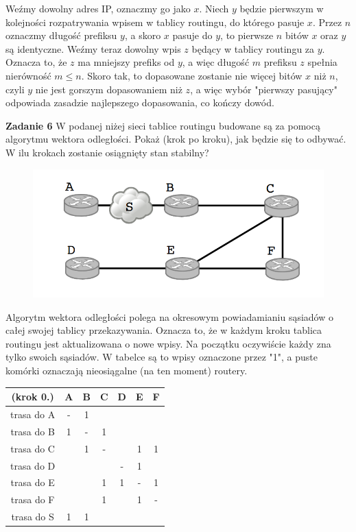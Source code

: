 \documentclass[a4paper,12pt]{article}
\begin{document}
\noindent Weźmy dowolny adres IP, oznaczmy go jako $x$. Niech $y$ będzie 
pierwszym w kolejności rozpatrywania wpisem w tablicy routingu, do którego 
pasuje $x$. Przez $n$ oznaczmy długość prefiksu $y$, a skoro $x$ pasuje do $y$,
to pierwsze $n$ bitów $x$ oraz $y$ są identyczne. Weźmy teraz dowolny wpis $z$
będący w tablicy routingu za $y$. Oznacza to, że $z$ ma mniejszy prefiks od $y$,
a więc długość $m$ prefiksu $z$ spełnia nierówność $m \leq n$. Skoro tak, to
dopasowane zostanie nie więcej bitów $x$ niż $n$, czyli $y$ nie jest gorszym
dopasowaniem niż $z$, a więc wybór "pierwszy pasujący" odpowiada zasadzie
najlepszego dopasowania, co kończy dowód.

\newpage
\noindent \textbf{Zadanie 6} \newline
W podanej niżej sieci tablice routingu budowane są za pomocą algorytmu wektora
odległości. Pokaż (krok po kroku), jak będzie się to odbywać. W ilu krokach
zostanie osiągnięty stan stabilny?

\begin{figure}[H]
    \includegraphics[width=\textwidth]{Pomocnicze/zadanie06.png}
\end{figure}

\noindent Algorytm wektora odległości polega na okresowym powiadamianiu sąsiadów
o całej swojej tablicy przekazywania. Oznacza to, że w każdym kroku tablica
routingu jest aktualizowana o nowe wpisy. Na początku oczywiście każdy zna tylko
swoich sąsiadów. W tabelce są to wpisy oznaczone przez "1", a puste komórki
oznaczają nieosiągalne (na ten moment) routery.

\begin{center}
    \begin{tabular}{|c|c|c|c|c|c|c|}
        \hline
        (krok 0.)   & A & B & C & D & E & F \\ \hline
        trasa do A  & - & 1 &   &   &   &   \\ \hline
        trasa do B  & 1 & - & 1 &   &   &   \\ \hline
        trasa do C  &   & 1 & - &   & 1 & 1 \\ \hline
        trasa do D  &   &   &   & - & 1 &   \\ \hline
        trasa do E  &   &   & 1 & 1 & - & 1 \\ \hline
        trasa do F  &   &   & 1 &   & 1 & - \\ \hline
        trasa do S  & 1 & 1 &   &   &   &   \\ \hline
    \end{tabular}
\end{center}
\end{document}
